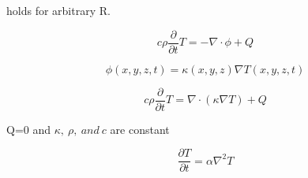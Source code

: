 \begin{appendices}
holds for arbitrary R.

\begin{equation}
c\rho\frac{\partial}{\partial t}T = - \nabla \cdot \phi + Q
\end{equation}

\begin{equation}
\phi(x,y,z,t)=\kappa(x,y,z)\nabla T(x,y,z,t)
\end{equation}

\begin{equation}
c\rho\frac{\partial}{\partial t}T = \nabla\cdot (\kappa\nabla T) + Q
\end{equation}

Q=0 and $\kappa,\ \rho,\ and\ c$ are constant

\begin{equation}
\frac{\partial T}{\partial t} = \alpha \nabla^2 T
\end{equation}

\end{appendices}